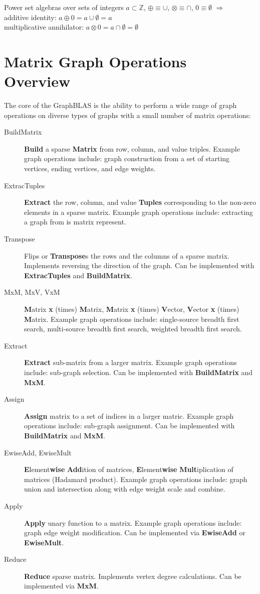 Power set algebras over sets of integers $a \subset \mathbb{Z}$, $\oplus \equiv \cup$, $\otimes \equiv \cap$, $0 \equiv \emptyset$ $\Rightarrow$ \\
additive identity: $a \oplus 0  =  a \cup \emptyset = a$ \\
multiplicative annihilator: $a \otimes 0 = a \cap \emptyset = \emptyset$


\section{Matrix Graph Operations Overview}

The core of the GraphBLAS is the ability to perform a wide range of graph operations on diverse types of graphs with a small number of matrix operations:
\begin{description}
\item[BuildMatrix] {\bf Build} a sparse {\bf Matrix} from row, column, and value triples.  Example graph operations include: graph construction from a set of starting vertices, ending vertices, and edge weights.
\item[ExtracTuples] {\bf Extract} the row, column, and value {\bf Tuples} corresponding to the non-zero elements in a sparse matrix.  Example graph operations include: extracting a graph from is matrix represent.
\item[Transpose] Flips or {\bf Transpose}s the rows and the columns of a sparse matrix.  Implements reversing the direction of the graph.  Can be implemented with  {\bf ExtracTuples} and {\bf BuildMatrix}.
\item[MxM, MxV, VxM] {\bf M}atrix {\bf x} (times) {\bf M}atrix,  {\bf M}atrix {\bf x} (times) {\bf V}ector, {\bf V}ector {\bf x} (times) {\bf M}atrix.   Example graph operations include: single-source breadth first search, multi-source breadth first search, weighted breadth first search.
\item[Extract] {\bf Extract} sub-matrix from a larger matrix. Example graph operations include: sub-graph selection.  Can be implemented with {\bf BuildMatrix} and {\bf MxM}.
\item[Assign] {\bf Assign} matrix to a set of indices in a larger matric.  Example graph operations include: sub-graph assignment.  Can be implemented with {\bf BuildMatrix} and {\bf MxM}.
\item[EwiseAdd, EwiseMult] {\bf E}lement{\bf wise} {\bf Add}ition of matrices, {\bf E}lement{\bf wise} {\bf Mult}iplication of matrices (Hadamard product). Example graph operations include: graph union and intersection along with edge weight scale and combine.
\item[Apply] {\bf Apply} unary function to a matrix.  Example graph operations include: graph edge weight modification.  Can be implemented via {\bf EwiseAdd} or {\bf EwiseMult}.
\item[Reduce] {\bf Reduce} sparse matrix.  Implements vertex degree calculations.  Can be implemented via {\bf MxM}.
\end{description}
